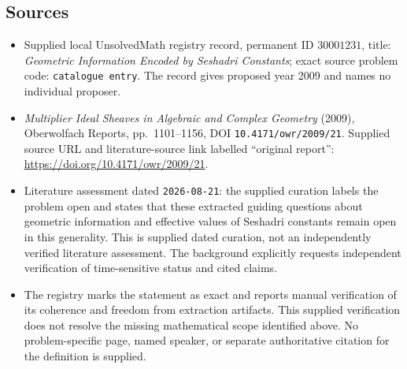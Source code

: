 \documentclass[11pt]{article}
\begin{document}
\subsection{Sources}
\begin{itemize}
\item Supplied local UnsolvedMath registry record, permanent ID \(30001231\), title: \emph{Geometric Information Encoded by Seshadri Constants}; exact source problem code: \texttt{catalogue entry}. The record gives proposed year 2009 and names no individual proposer.
\item \emph{Multiplier Ideal Sheaves in Algebraic and Complex Geometry} (2009), Oberwolfach Reports, pp.\ 1101--1156, DOI \texttt{10.4171/owr/2009/21}. Supplied source URL and literature-source link labelled ``original report'': \url{https://doi.org/10.4171/owr/2009/21}.
\item Literature assessment dated \texttt{2026-08-21}: the supplied curation labels the problem open and states that these extracted guiding questions about geometric information and effective values of Seshadri constants remain open in this generality. This is supplied dated curation, not an independently verified literature assessment. The background explicitly requests independent verification of time-sensitive status and cited claims.
\item The registry marks the statement as exact and reports manual verification of its coherence and freedom from extraction artifacts. This supplied verification does not resolve the missing mathematical scope identified above. No problem-specific page, named speaker, or separate authoritative citation for the definition is supplied.
\end{itemize}
\end{document}
